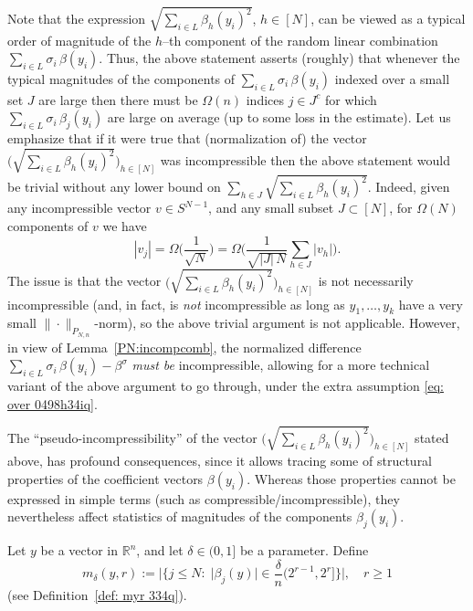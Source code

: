 \documentclass[11pt]{amsart}
\theoremstyle{definition}
\theoremstyle{plain}
\newcommand{\R}{\mathbb{R}}
\def\R{{\mathbb R}}
\begin{document}
Note that the expression $\sqrt{\sum_{i\in L}\beta_h(y_i)^2}$, $h\in[N]$,
can be viewed as a typical order of magnitude of the $h$--th
component of the random linear combination
$\sum_{i\in L}\sigma_i\,\beta(y_i)$.
Thus, the above statement asserts (roughly) that
whenever the typical magnitudes of the components of $\sum_{i\in L}\sigma_i\,\beta(y_i)$
indexed over a small set $J$ are large then there must be 
$\Omega(n)$ indices $j\in J^c$ for which
$\sum_{i\in L}\sigma_i\,\beta_j(y_i)$ are large on average (up to some loss
in the estimate).
Let us emphasize that if it were true that 
(normalization of)
the vector $\big(\sqrt{\sum_{i\in L}\beta_h(y_i)^2}\big)_{h\in[N]}$
was incompressible then the above statement would be trivial
without any lower bound on $\sum_{h\in J}\sqrt{\sum_{i\in L}\beta_h(y_i)^2}$.
Indeed, given any incompressible vector $v\in S^{N-1}$,
and any small subset $J\subset[N]$, for
$\Omega(N)$ components 
of $v$ we have
$$
|v_j|=\Omega\Big(\frac{1}{\sqrt{N}}\Big)
=\Omega\Big(\frac{1}{\sqrt{|J|\,N}}\sum_{h\in J}|v_h|\Big).
$$
The issue is that the vector $\big(\sqrt{\sum_{i\in L}\beta_h(y_i)^2}\big)_{h\in[N]}$ is not necessarily
incompressible (and, in fact, is {\it not} incompressible
as long as $y_1,\dots,y_k$
have a very small $\|\cdot\|_{P_{N,n}}$-norm),
so the above trivial argument is not applicable. However,
in view of Lemma~\ref{PN:incompcomb}, the normalized difference
$\sum_{i\in L}\sigma_i\,\beta(y_i)-\beta^\sigma$
{\it must be} incompressible, allowing for a more technical variant
of the above argument to go through, under the extra assumption \eqref{eq: over 0498h34iq}.

The ``pseudo-incompressibility'' of the vector $\big(\sqrt{\sum_{i\in L}\beta_h(y_i)^2}\big)_{h\in[N]}$
stated above, has profound consequences, since it allows tracing some of 
structural properties of the coefficient vectors $\beta(y_i)$.
Whereas those properties cannot be expressed in simple terms (such as compressible/incompressible),
they nevertheless affect statistics of magnitudes of the components $\beta_j(y_i)$.

Let $y$ be a vector in $\R^n$, and let $\delta\in(0,1]$
be a parameter.
Define
$$
m_\delta(y,r):=\Big|\Big\{
j\leq N:\;\big|\beta_j(y)\big|\in
\frac{\delta}{n}\big(2^{r-1},2^r\big]\Big\}\Big|,
\quad r\geq 1
$$
(see Definition~\ref{def: myr 334q}).
\end{document}
